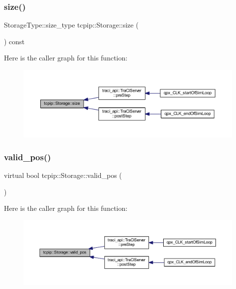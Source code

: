 \subsubsection{\texorpdfstring{size()}{size()}}
{\footnotesize\ttfamily Storage\+Type\+::size\+\_\+type tcpip\+::\+Storage\+::size (\begin{DoxyParamCaption}{ }\end{DoxyParamCaption}) const\hspace{0.3cm}{\ttfamily [inline]}}

Here is the caller graph for this function\+:
\nopagebreak
\begin{figure}[H]
\begin{center}
\leavevmode
\includegraphics[width=350pt]{classtcpip_1_1_storage_a69f9705be09f7e5be1a29f4d145f451a_icgraph}
\end{center}
\end{figure}
\mbox{\label{classtcpip_1_1_storage_a90dbd2c479e5f06fca80783660ffc648}} 
\subsubsection{\texorpdfstring{valid\+\_\+pos()}{valid\_pos()}}
{\footnotesize\ttfamily virtual bool tcpip\+::\+Storage\+::valid\+\_\+pos (\begin{DoxyParamCaption}{ }\end{DoxyParamCaption})\hspace{0.3cm}{\ttfamily [virtual]}}

Here is the caller graph for this function\+:
\nopagebreak
\begin{figure}[H]
\begin{center}
\leavevmode
\includegraphics[width=350pt]{classtcpip_1_1_storage_a90dbd2c479e5f06fca80783660ffc648_icgraph}
\end{center}
\end{figure}
\mbox{\label{classtcpip_1_1_storage_a5da17974ce811aefed71169685739073}} 

